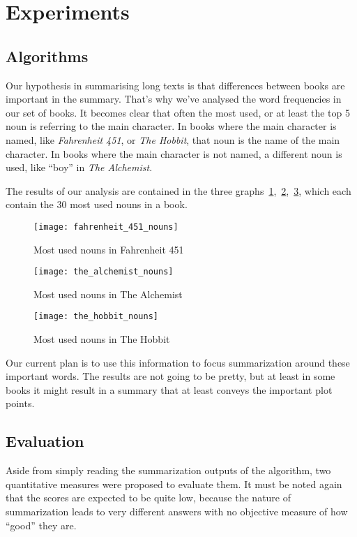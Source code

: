 \section{Experiments}

\subsection{Algorithms}

Our hypothesis in summarising long texts is that differences between books are
important in the summary. That's why we've analysed the word frequencies in our
set of books. It becomes clear that often the most used, or at least the top 5
noun is referring to the main character. In books where the main character is
named, like \textit{Fahrenheit 451}, or \textit{The Hobbit}, that noun is the
name of the main character. In books where the main character is not named, a
different noun is used, like ``boy'' in \textit{The Alchemist}.

The results of our analysis are contained in the three
graphs~\ref{fig:fahrenheit_451_nouns},~\ref{fig:the_alchemist_nouns},~\ref{fig:the_hobbit_nouns},
which each contain the 30 most used nouns in a book.

\begin{figure}[H]
	\centering
	\texttt{[image: fahrenheit\_451\_nouns]}
	\caption{Most used nouns in Fahrenheit 451}\label{fig:fahrenheit_451_nouns}
\end{figure}

\begin{figure}[H]
	\centering
	\texttt{[image: the\_alchemist\_nouns]}
	\caption{Most used nouns in The Alchemist}\label{fig:the_alchemist_nouns}
\end{figure}

\begin{figure}[H]
	\centering
	\texttt{[image: the\_hobbit\_nouns]}
	\caption{Most used nouns in The Hobbit}\label{fig:the_hobbit_nouns}
\end{figure}

Our current plan is to use this information to focus summarization around these
important words. The results are not going to be pretty, but at least in some
books it might result in a summary that at least conveys the important plot
points.

\subsection{Evaluation}
Aside from simply reading the summarization outputs of the algorithm, two
quantitative measures were proposed to evaluate them. It must be noted again
that the scores are expected to be quite low, because the nature of
summarization leads to very different answers with no objective measure of how
``good'' they are. 

